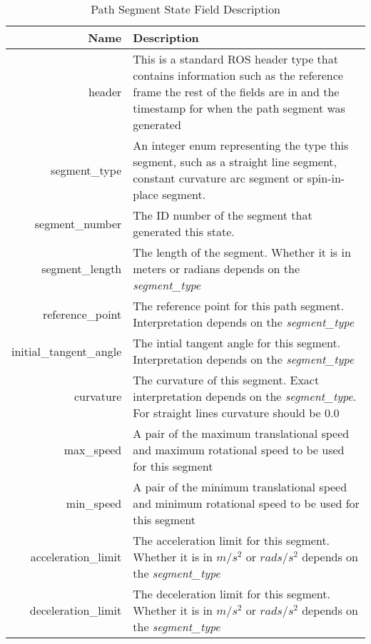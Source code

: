 \begin{table}[htbp]
	\begin{tabularx}{\textwidth}{|r|X|}
		\hline
		Name & Description \\
		\hline
		header & This is a standard ROS header type that contains information such as the reference frame the rest of the fields are in and the timestamp for when the path segment was generated \\
		\hline
		segment\_type & An integer enum representing the type this segment, such as a straight line segment, constant curvature arc segment or spin-in-place segment. \\
		\hline
		segment\_number & The ID number of the segment that generated this state. \\
		\hline
		segment\_length & The length of the segment. Whether it is in meters or radians depends on the \emph{segment\_type} \\
		\hline
		reference\_point & The reference point for this path segment. Interpretation depends on the \emph{segment\_type} \\
		\hline
		initial\_tangent\_angle & The intial tangent angle for this segment. Interpretation depends on the \emph{segment\_type} \\
		\hline
		curvature & The curvature of this segment. Exact interpretation depends on the \emph{segment\_type}. For straight lines curvature should be 0.0 \\
		\hline
		max\_speed & A pair of the maximum translational speed and maximum rotational speed to be used for this segment \\
		\hline
		min\_speed & A pair of the minimum translational speed and minimum rotational speed to be used for this segment \\	
		\hline
		acceleration\_limit & The acceleration limit for this segment. Whether it is in $m/s^2$ or $rads/s^2$ depends on the \emph{segment\_type} \\
		\hline
		deceleration\_limit	& The deceleration limit for this segment. Whether it is in $m/s^2$ or $rads/s^2$ depends on the \emph{segment\_type} \\
		\hline
	\end{tabularx}
	\caption{Path Segment State Field Description \label{table:path_segment_description}}
\end{table}

